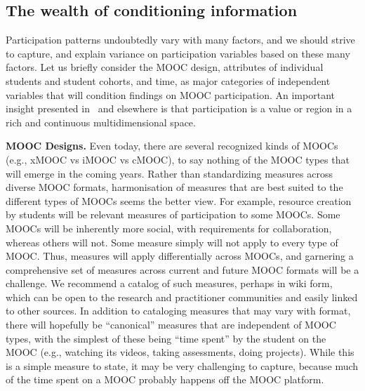 \subsection{The wealth of conditioning information}

Participation patterns
undoubtedly vary with many factors, and we should strive to capture, and
explain variance on participation variables based on these many
factors. Let us briefly consider the MOOC design, attributes
of individual students and student cohorts, and time, as major
categories of independent variables that will condition findings on MOOC
participation. An important insight presented in~\cite{mroe-2013-report}
and elsewhere is that participation is
a value or region in a rich and continuous multidimensional space.

\textbf{MOOC Designs.} Even today, there are several recognized kinds of MOOCs
(e.g., xMOOC vs iMOOC vs cMOOC), to say nothing of the MOOC types that
will emerge in the coming years.  Rather than standardizing measures
across diverse MOOC formats, harmonisation of measures that are best
suited to the different types of MOOCs seems the better view. For
example, resource creation by students will be relevant measures of
participation to some MOOCs. Some MOOCs will be inherently more social,
with requirements for collaboration, whereas others will not. Some
measure simply will not apply to every type of MOOC. Thus, measures will
apply differentially across MOOCs, and garnering a comprehensive set of
measures across current and future MOOC formats will be a challenge. We
recommend a catalog of such measures, perhaps in wiki form, which can be
open to the research and practitioner communities and easily linked to
other sources.  In addition to cataloging measures that may vary with
format, there will hopefully be ``canonical'' measures that are
independent of MOOC types, with the simplest of these being ``time spent''
by the student on the MOOC (e.g., watching its videos, taking
assessments, doing projects). While this is a simple measure to state,
it may be very challenging to capture, because much of the time spent on
a MOOC probably happens off the MOOC platform.  

